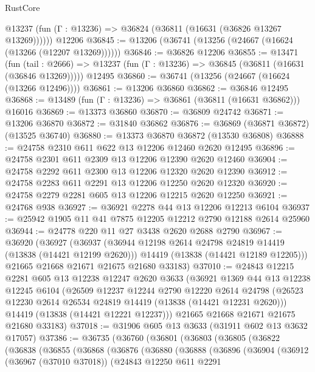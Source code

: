 \begin{lexlean}{RustCore}
\begin{coremodule}
      @13237 (fun (Γ : @13236) => @36824 (@36811 (@16631 (@36826 @13267 @13269))))))
    @12206
@36845 := @13206 (@36741 (@13256 (@24667 (@16624 (@13266 (@12207 @13269))))))
@36846 := @36826 @12206
@36855 := @13471
    (fun (tail : @2666) => @13237 (fun (Γ : @13236) => @36845 (@36811 (@16631 (@36846 @13269)))))
    @12495
@36860 := @36741 (@13256 (@24667 (@16624 (@13266 @12496))))
@36861 := @13206 @36860
@36862 := @36846 @12495
@36868 := @13489 (fun (Γ : @13236) => @36861 (@36811 (@16631 @36862))) @16016
@36869 := @13373 @36860
@36870 := @36809 @24742
@36871 := @13206 @36870
@36872 := @31840 @36862
@36876 := @36869 (@36871 @36872) (@13525 @36740)
@36880 := @13373 @36870 @36872 (@13530 @36808)
@36888 := @24758 @2310 @611 @622 @13 @12206 @12460 @2620 @12495
@36896 := @24758 @2301 @611 @2309 @13 @12206 @12390 @2620 @12460
@36904 := @24758 @2292 @611 @2300 @13 @12206 @12320 @2620 @12390
@36912 := @24758 @2283 @611 @2291 @13 @12206 @12250 @2620 @12320
@36920 := @24758 @2279 @2281 @605 @13 @12206 @12215 @2620 @12250
@36921 := @24768 @938
@36927 := @36921 @2278 @44 @13 @12206 @12213 @6104
@36937 := @25942 @1905 @11 @41 @7875 @12205 @12212 @2790 @12188 @2614 @25960
@36944 := @24778 @220 @11 @27 @3438 @2620 @2688 @2790
@36967 := @36920
    (@36927
      (@36937
        (@36944 @12198 @2614 @24798 @24819 @14419 (@13838 (@14421 @12199 @2620)))
        @14419
        (@13838 (@14421 @12189 @12205)))
      @21665
      @21668
      @21671
      @21675
      @21680
      @33183)
@37010 := @24843
    @12215
    @2281
    @605
    @13
    @12238
    @12247
    @2620
    @3633
    (@36921
      @1369
      @44
      @13
      @12238
      @12245
      @6104
      (@26509
        @12237
        @12244
        @2790
        @12220
        @2614
        @24798
        (@26523 @12230 @2614 @26534 @24819 @14419 (@13838 (@14421 @12231 @2620)))
        @14419
        (@13838 (@14421 @12221 @12237)))
      @21665
      @21668
      @21671
      @21675
      @21680
      @33183)
@37018 := @31906 @605 @13 @3633 (@31911 @602 @13 @3632 @17057)
@37386 := @36735
    (@36760
      (@36801
        (@36803
          (@36805
            (@36822
              (@36838
                (@36855
                  (@36868
                    (@36876
                      (@36880
                        (@36888
                          (@36896
                            (@36904
                              (@36912
                                (@36967 (@37010 @37018))
                                (@24843
                                  @12250
                                  @611
                                  @2291

\end{coremodule}
\end{lexlean}
